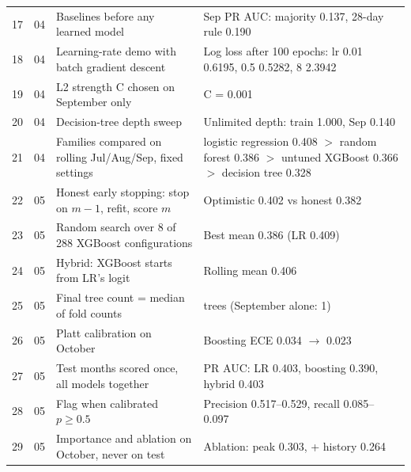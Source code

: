 \documentclass[conference]{IEEEtran}
\begin{document}
\begin{longtable}{@{}r c >{\raggedright\arraybackslash}p{3.0in} >{\raggedright\arraybackslash}p{3.2in}@{}}
17 & 04 & Baselines before any learned model & Sep PR AUC: majority 0.137, 28-day rule 0.190\\
18 & 04 & Learning-rate demo with batch gradient descent & Log loss after 100 epochs: lr 0.01 0.6195, 0.5 0.5282, 8 2.3942\\
19 & 04 & L2 strength C chosen on September only & C = 0.001\\
20 & 04 & Decision-tree depth sweep & Unlimited depth: train 1.000, Sep 0.140\\
21 & 04 & Families compared on rolling Jul/Aug/Sep, fixed settings & logistic regression 0.408 $>$ random forest 0.386 $>$ untuned XGBoost 0.366 $>$ decision tree 0.328\\
22 & 05 & Honest early stopping: stop on $m-1$, refit, score $m$ & Optimistic 0.402 vs honest 0.382\\
23 & 05 & Random search over 8 of 288 XGBoost configurations & Best mean 0.386 (LR 0.409)\\
24 & 05 & Hybrid: XGBoost starts from LR's logit & Rolling mean 0.406\\
25 & 05 & Final tree count = median of fold counts & 40 trees (September alone: 1)\\
26 & 05 & Platt calibration on October & Boosting ECE 0.034 $\rightarrow$ 0.023\\
27 & 05 & Test months scored once, all models together & PR AUC: LR 0.403, boosting 0.390, hybrid 0.403\\
28 & 05 & Flag when calibrated $p \geq 0.5$ & Precision 0.517--0.529, recall 0.085--0.097\\
29 & 05 & Importance and ablation on October, never on test & Ablation: peak 0.303, + history 0.264\\
\bottomrule
\end{longtable}
\end{document}
